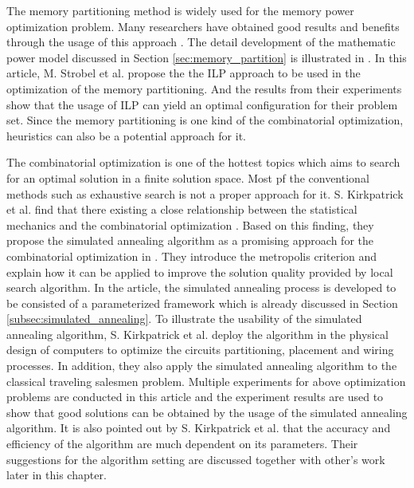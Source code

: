 \label{chap:related_work}
The memory partitioning method is widely used for the memory power
optimization problem. Many researchers have obtained good results
and benefits through the usage of this approach
\cite{Strobel2016, 876761, 4415607}.
The detail development of the mathematic power model discussed in
Section \ref{sec:memory_partition} is illustrated in \cite{Strobel2016}.
In this article, M. Strobel et al. propose the the ILP approach to
be used in the optimization of the memory partitioning. And the results
from their experiments show that the usage of ILP can yield an optimal
configuration for their problem set. Since the memory partitioning is
one kind of the combinatorial optimization, heuristics can also be a
potential approach for it.

The combinatorial optimization is one of the hottest topics which
aims to search for an optimal solution in a finite solution space.
Most pf the conventional methods such as exhaustive search is not a proper
approach for it.
S. Kirkpatrick et al. find that there existing a close relationship
between the statistical mechanics and the combinatorial optimization
\cite{10.2307/1690046}.
Based on this finding, they propose the simulated annealing algorithm
as a promising approach for the combinatorial optimization in
\cite{10.2307/1690046}.
They introduce the metropolis criterion and explain how it can be
applied to improve the solution quality provided by local search
algorithm. In the article, the simulated annealing process is
developed to be consisted of a parameterized framework which is already
discussed in Section \ref{subsec:simulated_annealing}. To illustrate
the usability of the simulated annealing algorithm, S. Kirkpatrick et al.
deploy the algorithm in the physical design of computers to optimize the
circuits partitioning, placement and wiring processes.
In addition, they also apply the simulated annealing algorithm to the classical
traveling salesmen problem. Multiple experiments for above optimization
problems are conducted in this article and the experiment results are
used to show that good solutions can be obtained by the usage of the
simulated annealing algorithm. It is also pointed out by S. Kirkpatrick et al.
that the accuracy and efficiency of the algorithm are much dependent on
its parameters. Their suggestions for the algorithm setting are discussed
together with other's work later in this chapter.

